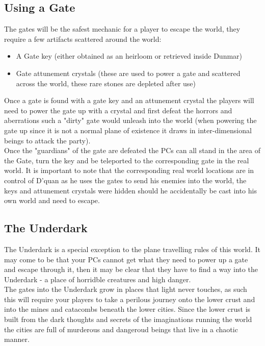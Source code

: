 \documentclass[10pt,twoside,twocolumn]{article}
\begin{document}
\subsection{Using a Gate}
The gates will be the safest mechanic for a player to escape the world, they require a few artifacts scattered around the world:\\

\begin{itemize}
\item A Gate key (either obtained as an heirloom or retrieved inside Dunmar)
\item Gate attunement crystals (these are used to power a gate and scattered across the world, these rare stones are depleted after use)
\end{itemize}

Once a gate is found with a gate key and an attunement crystal the players will need to power the gate up with a crystal and first defeat the horrors and aberrations such a "dirty" gate would unleash into the world (when powering the gate up since it is not a normal plane of existence it draws in inter-dimensional beings to attack the party).\\

Once the "guardians" of the gate are defeated the PCs can all stand in the area of the Gate, turn the key and be teleported to the corresponding gate in the real world. It is important to note that the corresponding real world locations are in control of D'quan as he uses the gates to send his enemies into the world, the keys and attunement crystals were hidden should he accidentally be cast into his own world and need to escape.\\

\subsection{The Underdark}
The Underdark is a special exception to the plane travelling rules of this world. It may come to be that your PCs cannot get what they need to power up a gate and escape through it, then it may be clear that they have to find a way into the Underdark - a place of horridble creatures and high danger.\\

The gates into the Underdark grow in places that light never touches, as such this will require your players to take a perilous journey onto the lower crust and into the mines and catacombs beneath the lower cities. Since the lower crust is built from the dark thoughts and secrets of the imaginations running the world the cities are full of murderous and dangeroud beings that live in a chaotic manner.\\
\end{document}
